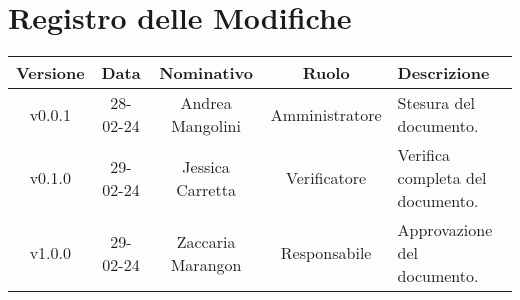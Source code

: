 \section*{\Large Registro delle Modifiche}
    \begin{table}[h]
        \centering
        \renewcommand\tabularxcolumn[1]{m{#1}} %
        \renewcommand{\arraystretch}{1.5}
        \begin{tabularx}{0.98\textwidth}
            {c|c|c|c|>{\centering\arraybackslash}X}
            \rowcolor{black}
            \textbf{\color{white} Versione} & \textbf{\color{white} Data} & \textbf{\color{white} Nominativo} & \textbf{\color{white} Ruolo} & \textbf{\color{white} Descrizione} \\ 
            \hline

            v0.0.1 & 28-02-24 & Andrea Mangolini & Amministratore & Stesura del documento. \\
            v0.1.0 & 29-02-24 & Jessica Carretta & Verificatore & Verifica completa del documento. \\
            v1.0.0 & 29-02-24 & Zaccaria Marangon & Responsabile & Approvazione del documento. \\
            \hline
        \end{tabularx}
    \end{table}